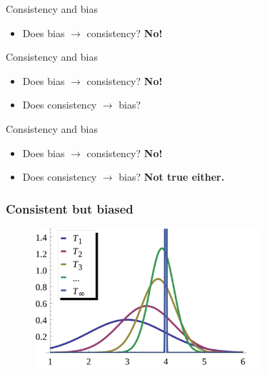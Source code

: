 \documentclass[aspectratio=169]{beamer}
\begin{document}
\begin{frame}{Consistency and bias}
    \begin{itemize}
        \item Does bias $\rightarrow$ consistency? \textbf{No!}
    \end{itemize}
\end{frame}

\begin{frame}{Consistency and bias}
    \begin{itemize}
        \item Does bias $\rightarrow$ consistency? \textbf{No!}
        \item Does consistency $\rightarrow$ bias?
    \end{itemize}
\end{frame}

\begin{frame}{Consistency and bias}
    \begin{itemize}
        \item Does bias $\rightarrow$ consistency? \textbf{No!}
        \item Does consistency $\rightarrow$ bias? \textbf{Not true either.}
    \end{itemize}
\end{frame}


\begin{frame}[shrink]
    \frametitle{Consistent but biased}
    \begin{figure}[htbp]
        \centering
        \includegraphics[width=0.75\textwidth]{./consistency.png}
    \end{figure}
\end{frame}
\end{document}
